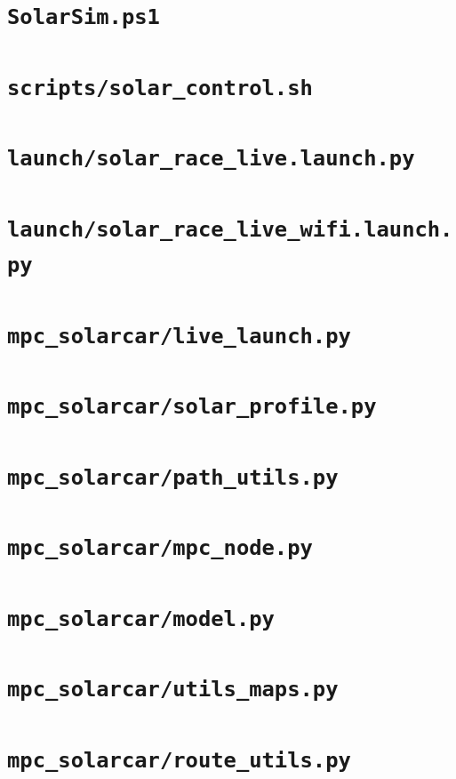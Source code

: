 \documentclass[a4paper,10pt,oneside]{book}
\begin{document}
\section{\texttt{SolarSim.ps1}}

\section{\texttt{scripts/solar\_control.sh}}

\section{\texttt{launch/solar\_race\_live.launch.py}}

\section{\texttt{launch/solar\_race\_live\_wifi.launch.py}}

\section{\texttt{mpc\_solarcar/live\_launch.py}}

\section{\texttt{mpc\_solarcar/solar\_profile.py}}

\section{\texttt{mpc\_solarcar/path\_utils.py}}

\section{\texttt{mpc\_solarcar/mpc\_node.py}}

\section{\texttt{mpc\_solarcar/model.py}}

\section{\texttt{mpc\_solarcar/utils\_maps.py}}

\section{\texttt{mpc\_solarcar/route\_utils.py}}

\end{document}
